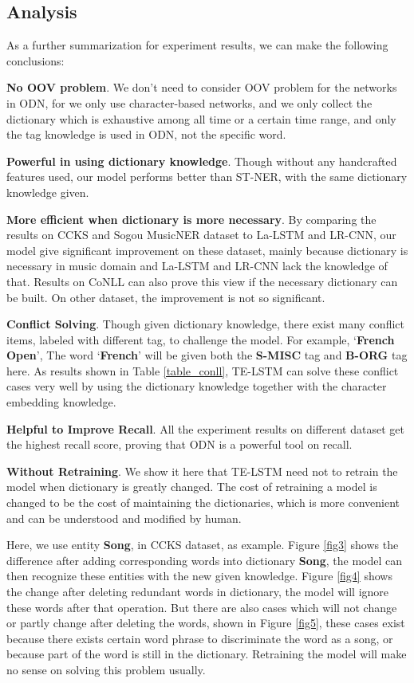 \documentclass[letterpaper]{article} %
\begin{document}
\subsection{Analysis}

As a further summarization for experiment results, we can make the following conclusions:

\textbf{No OOV problem}. We don't need to consider OOV problem for the networks in ODN, for we only use character-based networks, and we only collect the dictionary which is exhaustive among all time or a certain time range, and only the tag knowledge is used in ODN, not the specific word.

\textbf{Powerful in using dictionary knowledge}. Though without any handcrafted features used, our model performs better than ST-NER, with the same dictionary knowledge given.

\textbf{More efficient when dictionary is more necessary}. By comparing the results on CCKS and Sogou MusicNER dataset to La-LSTM and LR-CNN, our model give significant improvement on these dataset, mainly because dictionary is necessary in music domain and La-LSTM and LR-CNN lack the knowledge of that. Results on CoNLL can also prove this view if the necessary dictionary can be built. On other dataset, the improvement is not so significant.

\textbf{Conflict Solving}. Though given dictionary knowledge, there exist many conflict items, labeled with different tag, to challenge the model. For example, `\textbf{French Open}', The word `\textbf{French}' will be given both the \textbf{S-MISC} tag and \textbf{B-ORG} tag here. As results shown in Table \ref{table_conll}, TE-LSTM can solve these conflict cases very well by using the dictionary knowledge together with the character embedding knowledge.

\textbf{Helpful to Improve Recall}. All the experiment results on different dataset get the highest recall score, proving that ODN is a powerful tool on recall.

\textbf{Without Retraining}. We show it here that TE-LSTM need not to retrain the model when dictionary is greatly changed. The cost of retraining a model is changed to be the cost of maintaining the dictionaries, which is more convenient and can be understood and modified by human. 

Here, we use entity \textbf{Song}, in CCKS dataset, as example. Figure \ref{fig3} shows the difference after adding corresponding words into dictionary \textbf{Song}, the model can then recognize these entities with the new given knowledge. Figure \ref {fig4} shows the change after deleting redundant words in dictionary, the model will ignore these words after that operation. But there are also cases which will not change or partly change after deleting the words, shown in Figure \ref{fig5},  these cases exist because there exists certain word phrase to discriminate the word as a song,  or because part of the word is still in the dictionary. Retraining the model will make no sense on solving this problem usually.
\end{document}
